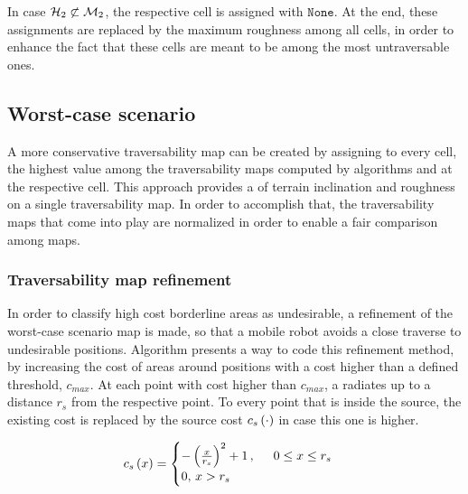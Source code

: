\begin{remark}
In case $\mathcal{H}_2 \not\subset \mathcal{M}_2$, the respective cell is assigned with $\texttt{None}$. At the end, these assignments are replaced by the maximum roughness among all cells, in order to enhance the fact that these cells are meant to be among the most untraversable ones.
\end{remark}

\subsection{Worst-case scenario}
\label{subsection:worstCaseScenario}

A more conservative traversability map can be created by assigning to every cell, the highest value among the traversability maps computed by algorithms  and  at the respective cell. This approach provides a  of terrain inclination and roughness on a single traversability map. In order to accomplish that, the traversability maps that come into play are normalized in order to enable a fair comparison among maps.

\subsubsection*{Traversability map refinement}
\label{subsubsec:costMapRefinement}

In order to classify high cost borderline areas as undesirable, a refinement of the worst-case scenario map is made, so that a mobile robot avoids a close traverse to undesirable positions. Algorithm  presents a way to code this refinement method, by increasing the cost of areas around positions with a cost higher than a defined threshold, $c_{max}$. At each point with cost higher than $c_{max}$, a  radiates up to a distance $r_s$ from the respective point. To every point that is inside the source, the existing cost is replaced by the source cost $c_s \left(\cdot \right)$ in case this one is higher.

\begin{equation}
c_s \left(x \right) = \begin{cases} -\left( \frac{x}{r_s} \right)^2 + 1 \, , \hspace{5mm} 0 \leq x \leq r_s\\
0,\,x > r_s \end{cases}
\label{eq:sourceCost}
\end{equation}

